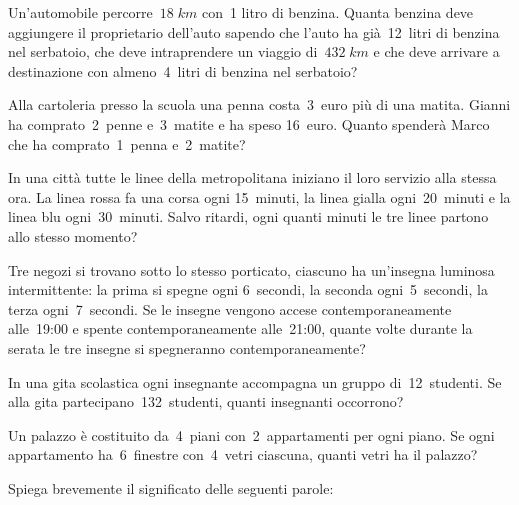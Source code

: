 \begin{multicols}{2}
 \begin{esercizio}[\Ast]
 Un'automobile percorre~$18\;\unit{km}$ con~1 litro di benzina. Quanta benzina deve aggiungere il proprietario dell'auto
sapendo che l'auto ha già~12~litri di benzina nel serbatoio, che deve intraprendere un viaggio di~$432\;\unit{km}$ e che deve
arrivare a destinazione con almeno~4~litri di benzina nel serbatoio?
\end{esercizio}

\begin{esercizio}[\Ast]
Alla cartoleria presso la scuola una penna costa~3~euro più di una matita. Gianni ha comprato~2~penne e~3~matite e ha speso
16~euro. Quanto spenderà Marco che ha comprato~1~penna e~2~matite?
\end{esercizio}

\begin{esercizio}[\Ast]
 In una città tutte le linee della metropolitana iniziano il loro servizio alla stessa ora. La linea rossa fa una corsa ogni
15~minuti, la linea gialla ogni~20~minuti e la linea blu ogni~30~minuti. Salvo ritardi, ogni quanti minuti le tre linee
partono allo stesso momento?
\end{esercizio}

\begin{esercizio}
 Tre negozi si trovano sotto lo stesso porticato, ciascuno ha un'insegna luminosa intermittente: la prima si spegne ogni
6~secondi, la seconda ogni~5~secondi, la terza ogni~7~secondi. Se le insegne vengono accese contemporaneamente
alle~19:00 e spente contemporaneamente alle~21:00, quante volte durante la serata le tre insegne
si spegneranno contemporaneamente?
\end{esercizio}

\begin{esercizio}
In una gita scolastica ogni insegnante accompagna un gruppo di~12~studenti. Se alla gita partecipano~132~studenti,
quanti insegnanti occorrono?
\end{esercizio}

\begin{esercizio}
Un palazzo è costituito da~4~piani con~2~appartamenti per ogni piano. Se ogni appartamento ha~6~finestre con~4~vetri
ciascuna, quanti vetri ha il palazzo?
\end{esercizio}

\begin{esercizio}
Spiega brevemente il significato delle seguenti parole:


\end{esercizio}
\end{multicols}
